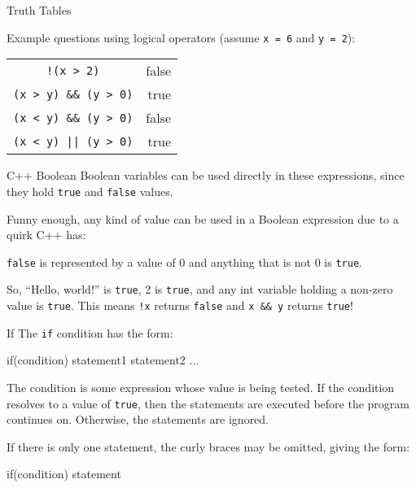 \documentclass[../lecture3-flowofcontrol.tex]{subfiles}
\begin{document}
\begin{frame}[fragile]{Truth Tables}
    \begin{center}
        Example questions using logical operators (assume \verb|x = 6| and \verb|y = 2|):
    \end{center}

    \begin{table}
        \center
        \begin{tabular}{cr}
            \verb|!(x > 2)|           & \pause false \\
            \pause \verb|(x > y) && (y > 0)| & \pause true  \\
            \pause \verb|(x < y) && (y > 0)| & \pause false \\
            \pause \verb+(x < y) || (y > 0)+ & \pause true  \\
        \end{tabular}
    \end{table}
\end{frame}

\begin{frame}[fragile]{C++ Boolean}
    Boolean variables can be used directly in these expressions, since they hold \verb|true| and \verb|false| values. \newline

    Funny enough, any kind of value can be used in a Boolean expression due to a quirk C++ has:
    \begin{center}
        \verb|false| is represented by a value of 0 and anything that is not 0 is \verb|true|. \newline
    \end{center}

    So, “Hello, world!” is \verb|true|, 2 is \verb|true|, and any int variable holding a non-zero value is \verb|true|. This means \verb|!x| returns \verb|false| and \verb|x && y| returns \verb|true|!
\end{frame}


\begin{frame}[fragile]{If}
    The \verb|if| condition has the form:
\begin{cppcode}[]
if(condition)
{
    statement1
    statement2
    ...
}
\end{cppcode}

    The condition is some expression whose value is being tested. If the condition resolves to a value of \texttt{true}, then the statements are executed before the program continues on. Otherwise, the statements are ignored. \newline

    If there is only one statement, the curly braces may be omitted, giving the form:

\begin{cppcode}[]
if(condition)
    statement
\end{cppcode}
\end{frame}
\end{document}
